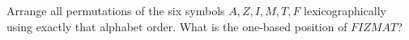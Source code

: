Arrange all permutations of the six symbols $A,Z,I,M,T,F$ lexicographically using exactly that alphabet order. What is the one-based position of $FIZMAT$?
